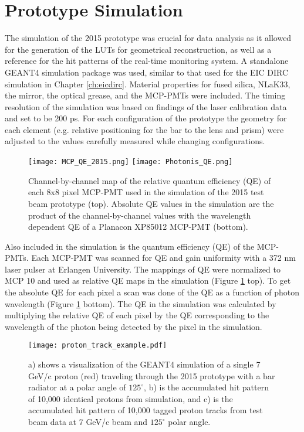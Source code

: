 \section{Prototype Simulation}
The simulation of the 2015 prototype was crucial for data analysis as it allowed for the generation of the LUTs for geometrical reconstruction, as well as a reference for the hit patterns of the real-time monitoring system. A standalone GEANT4 simulation package was used, similar to that used for the EIC DIRC simulation in Chapter \ref{ch:eicdirc}. Material properties for fused silica, NLaK33, the mirror, the optical grease, and the MCP-PMTs were included. The timing resolution of the simulation was based on findings of the laser calibration data and set to be 200 ps. For each configuration of the prototype the geometry for each element (e.g. relative positioning for the bar to the lens and prism) were adjusted to the values carefully measured while changing configurations.

\begin{figure}[!htb]
	\centering
	\texttt{[image: MCP\_QE\_2015.png]}
	\texttt{[image: Photonis\_QE.png]}
	\caption{Channel-by-channel map of the relative quantum efficiency (QE) of each 8x8 pixel MCP-PMT used in the simulation of the 2015 test beam prototype (top). Absolute QE values in the simulation are the product of the channel-by-channel values with the wavelength dependent QE of a Planacon XP85012 MCP-PMT (bottom).}
	\label{fig:quantum_efficiency}
\end{figure}

Also included in the simulation is the quantum efficiency (QE) of the MCP-PMTs. Each MCP-PMT was scanned for QE and gain uniformity with a 372 nm laser pulser at Erlangen University. The mappings of QE were normalized to MCP 10 and used as relative QE maps in the simulation (Figure \ref{fig:quantum_efficiency} top). To get the absolute QE for each pixel a scan was done of the QE as a function of photon wavelength (Figure \ref{fig:quantum_efficiency} bottom). The QE in the simulation was calculated by multiplying the relative QE of each pixel by the QE corresponding to the wavelength of the photon being detected by the pixel in the simulation.

\begin{figure}[!htb]
	\centering
	\texttt{[image: proton\_track\_example.pdf]}
	\caption{a) shows a visualization of the GEANT4 simulation of a single 7 GeV/c proton (red) traveling through the 2015 prototype with a bar radiator at a polar angle of $125^{\circ}$, b) is the accumulated hit pattern of 10,000 identical protons from simulation, and c) is the accumulated hit pattern of 10,000 tagged proton tracks from test beam data at 7 GeV/c beam and $125^{\circ}$ polar angle.}
	\label{fig:proton_track_example}
\end{figure}

